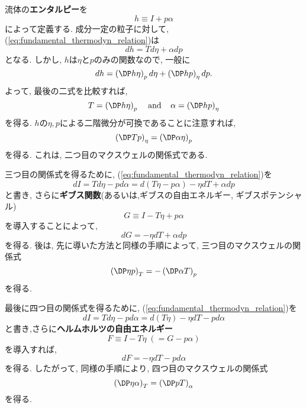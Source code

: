 流体の\textbf{エンタルピー}を
\begin{equation}
 h \equiv  I + p\alpha
\end{equation}
によって定義する. 
成分一定の粒子に対して, (\ref{eq:fundamental_thermodyn_relation})は
\begin{equation}
 dh = Td\eta + \alpha dp
\end{equation}
となる. 
しかし, $h$は$\eta$と$p$のみの関数なので, 一般に
\begin{equation}
 dh = \DPext{h}{\eta}{p}d\eta + \DPext{h}{p}{\eta}dp. 
  \label{eq:fundamental_thermodyn_relation_byenthalpy}
\end{equation}
よって, 最後の二式を比較すれば, 
\begin{equation}
 T=\DPext{h}{\eta}{p} \;\;\;\; {\rm and} \;\;\;\;
 \alpha = \DPext{h}{p}{\eta}
\end{equation}
を得る. 
$h$の$\eta,p$による二階微分が可換であることに注意すれば, 
\begin{equation}
 \DPext{T}{p}{\eta} = \DPext{\alpha}{\eta}{p}
\end{equation}
を得る. 
これは, 二つ目のマクスウェルの関係式である. 

三つ目の関係式を得るために, (\ref{eq:fundamental_thermodyn_relation})を
\begin{equation}
 dI = Td\eta - pd\alpha =d(T\eta - p\alpha) - \eta dT +\alpha dp
\end{equation}
と書き, さらに\textbf{ギブス関数}(あるいは,ギブスの自由エネルギー, ギブスポテンシャル)
\begin{equation}
 G \equiv I - T\eta + p\alpha
\end{equation}
を導入することによって, 
\begin{equation}
 dG = - \eta dT + \alpha dp
 \label{eq:fundamental_thermodyn_relation_byGibbsEn}
\end{equation}
を得る. 
後は, 先に導いた方法と同様の手順によって, 
三つ目のマクスウェルの関係式
\begin{equation}
 \DPext{\eta}{p}{T} = -\DPext{\alpha}{T}{p}
 \label{eq:Maxwell_third_relation}
\end{equation}
を得る. 

最後に四つ目の関係式を得るために, (\ref{eq:fundamental_thermodyn_relation})を
\begin{equation}
 dI = Td\eta - pd\alpha =d(T\eta) - \eta dT - pd\alpha
\end{equation}
と書き,さらに\textbf{ヘルムホルツの自由エネルギー}
\begin{equation}
 F \equiv I - T\eta \; (= G - p\alpha)
 \label{eq:fundamental_thermodyn_relation_byHelmEn}
\end{equation}
を導入すれば, 
\begin{equation}
 dF = - \eta dT - pd\alpha
\end{equation}
を得る. 
したがって, 同様の手順により, 
四つ目のマクスウェルの関係式
\begin{equation}
 \DPext{\eta}{\alpha}{T} = \DPext{p}{T}{\alpha}
  \label{eq:Maxwell_fourth_relation}
\end{equation}
を得る. 

